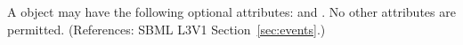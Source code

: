 A \Trigger object may have the following optional attributes:
 and .  
No other attributes are permitted.  
(References: SBML L3V1 Section~\ref{sec:events}.)
